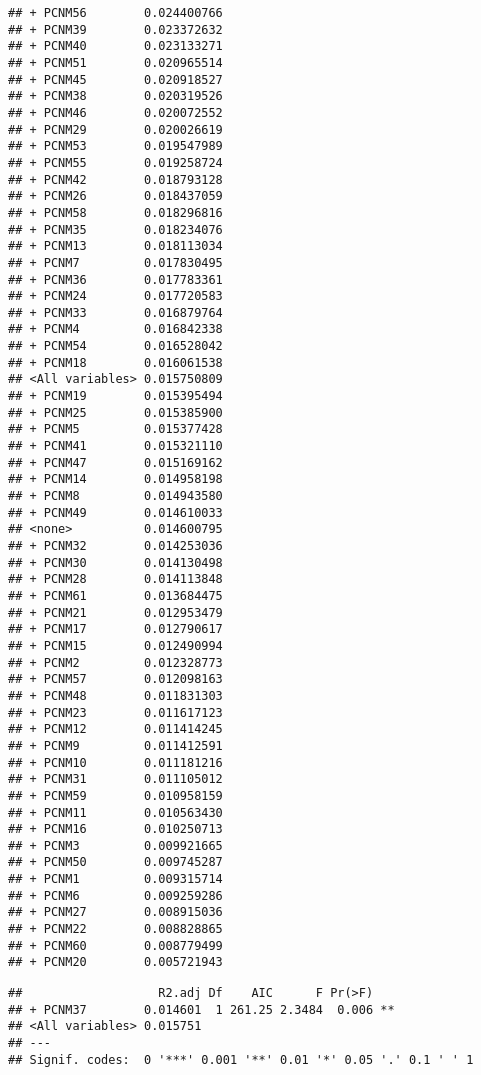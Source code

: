 \documentclass[
]{article}
\newenvironment{Shaded}{\begin{snugshade}}{\end{snugshade}}
\newcommand{\NormalTok}[1]{#1}
\newcommand{\OperatorTok}[1]{\textcolor[rgb]{0.81,0.36,0.00}{\textbf{#1}}}
\begin{document}
\begin{verbatim}
## + PCNM56        0.024400766
## + PCNM39        0.023372632
## + PCNM40        0.023133271
## + PCNM51        0.020965514
## + PCNM45        0.020918527
## + PCNM38        0.020319526
## + PCNM46        0.020072552
## + PCNM29        0.020026619
## + PCNM53        0.019547989
## + PCNM55        0.019258724
## + PCNM42        0.018793128
## + PCNM26        0.018437059
## + PCNM58        0.018296816
## + PCNM35        0.018234076
## + PCNM13        0.018113034
## + PCNM7         0.017830495
## + PCNM36        0.017783361
## + PCNM24        0.017720583
## + PCNM33        0.016879764
## + PCNM4         0.016842338
## + PCNM54        0.016528042
## + PCNM18        0.016061538
## <All variables> 0.015750809
## + PCNM19        0.015395494
## + PCNM25        0.015385900
## + PCNM5         0.015377428
## + PCNM41        0.015321110
## + PCNM47        0.015169162
## + PCNM14        0.014958198
## + PCNM8         0.014943580
## + PCNM49        0.014610033
## <none>          0.014600795
## + PCNM32        0.014253036
## + PCNM30        0.014130498
## + PCNM28        0.014113848
## + PCNM61        0.013684475
## + PCNM21        0.012953479
## + PCNM17        0.012790617
## + PCNM15        0.012490994
## + PCNM2         0.012328773
## + PCNM57        0.012098163
## + PCNM48        0.011831303
## + PCNM23        0.011617123
## + PCNM12        0.011414245
## + PCNM9         0.011412591
## + PCNM10        0.011181216
## + PCNM31        0.011105012
## + PCNM59        0.010958159
## + PCNM11        0.010563430
## + PCNM16        0.010250713
## + PCNM3         0.009921665
## + PCNM50        0.009745287
## + PCNM1         0.009315714
## + PCNM6         0.009259286
## + PCNM27        0.008915036
## + PCNM22        0.008828865
## + PCNM60        0.008779499
## + PCNM20        0.005721943
\end{verbatim}

\begin{Shaded}
\end{Shaded}

\begin{verbatim}
##                   R2.adj Df    AIC      F Pr(>F)   
## + PCNM37        0.014601  1 261.25 2.3484  0.006 **
## <All variables> 0.015751                           
## ---
## Signif. codes:  0 '***' 0.001 '**' 0.01 '*' 0.05 '.' 0.1 ' ' 1
\end{verbatim}
\end{document}
